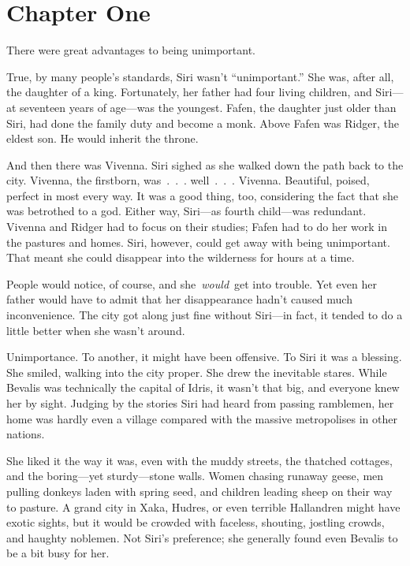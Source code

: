 \section{Chapter One}

There were great advantages to being unimportant.

True, by many people’s standards, Siri wasn’t “unimportant.” She was, after all, the daughter of a king. Fortunately, her father had four living children, and Siri—at seventeen years of age—was the youngest. Fafen, the daughter just older than Siri, had done the family duty and become a monk. Above Fafen was Ridger, the eldest son. He would inherit the throne.

And then there was Vivenna. Siri sighed as she walked down the path back to the city. Vivenna, the firstborn, was~.~.~. well~.~.~. Vivenna. Beautiful, poised, perfect in most every way. It was a good thing, too, considering the fact that she was betrothed to a god. Either way, Siri—as fourth child—was redundant. Vivenna and Ridger had to focus on their studies; Fafen had to do her work in the pastures and homes. Siri, however, could get away with being unimportant. That meant she could disappear into the wilderness for hours at a time.

People would notice, of course, and she~\textit{would}~get into trouble. Yet even her father would have to admit that her disappearance hadn’t caused much inconvenience. The city got along just fine without Siri—in fact, it tended to do a little better when she wasn’t around.

Unimportance. To another, it might have been offensive. To Siri it was a blessing. She smiled, walking into the city proper. She drew the inevitable stares. While Bevalis was technically the capital of Idris, it wasn’t that big, and everyone knew her by sight. Judging by the stories Siri had heard from passing ramblemen, her home was hardly even a village compared with the massive metropolises in other nations.

She liked it the way it was, even with the muddy streets, the thatched cottages, and the boring—yet sturdy—stone walls. Women chasing runaway geese, men pulling donkeys laden with spring seed, and children leading sheep on their way to pasture. A grand city in Xaka, Hudres, or even terrible Hallandren might have exotic sights, but it would be crowded with faceless, shouting, jostling crowds, and haughty noblemen. Not Siri’s preference; she generally found even Bevalis to be a bit busy for her.

